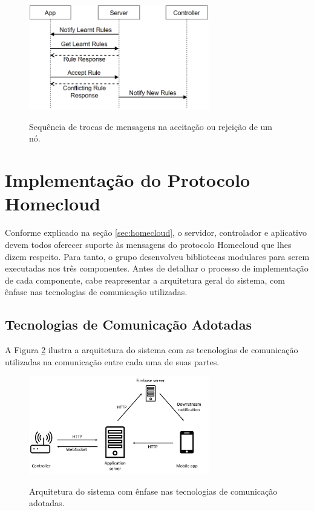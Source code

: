 \begin{figure}[h]
	\centering
	\caption{Sequência de trocas de mensagens na aceitação ou rejeição de um nó.}
  \includegraphics[width=0.7\textwidth]{imagens/mensagens_accept_rule.png}
  \label{fig:mensagens_accept_rule}  
\end{figure}

\section{Implementação do Protocolo Homecloud}
Conforme explicado na seção \ref{sec:homecloud}, o servidor, controlador e aplicativo devem todos oferecer suporte às mensagens do protocolo Homecloud que lhes dizem respeito. Para tanto, o grupo desenvolveu bibliotecas modulares para serem executadas nos três componentes. Antes de detalhar o processo de implementação de cada componente, cabe reapresentar a arquitetura geral do sistema, com ênfase nas tecnologias de comunicação utilizadas.

\subsection{Tecnologias de Comunicação Adotadas}
A Figura \ref{fig:arquitetura_tecnologias} ilustra a arquitetura do sistema com as tecnologias de comunicação utilizadas na comunicação entre cada uma de suas partes.

\begin{figure}[h]
	\centering
	\caption{Arquitetura do sistema com ênfase nas tecnologias de comunicação adotadas.}
  \includegraphics[width=0.7\textwidth]{imagens/arquitetura_tecnologias.png}
  \label{fig:arquitetura_tecnologias}  
\end{figure}

